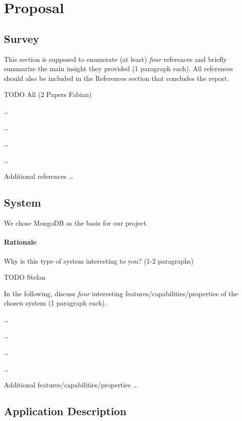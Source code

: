 \section{Proposal}

\subsection{Survey}

This section is supposed to enumerate (at least) \emph{four} references and
briefly summarize the main insight they provided (1 paragraph each). All
references should also be included in the References section that concludes the
report.

TODO All (2 Papers Fabian)

\begin{packed_enum}
   \item \ldots
   \item \ldots
   \item \ldots
   \item \ldots
   \item Additional references \ldots
\end{packed_enum}

\subsection{System}

We chose MongoDB as the basis for our project.

\paragraph{Rationale} Why is this type of system interesting to you? (1-2
paragraphs)

TODO Stefan

In the following, discuss \emph{four} interesting
features/capabilities/properties of the chosen system (1 paragraph each).
\begin{packed_enum}
    \item \ldots
    \item \ldots
    \item \ldots
    \item \ldots
    \item Additional features/capabilities/properties \ldots
\end{packed_enum}

\subsection{Application Description}

